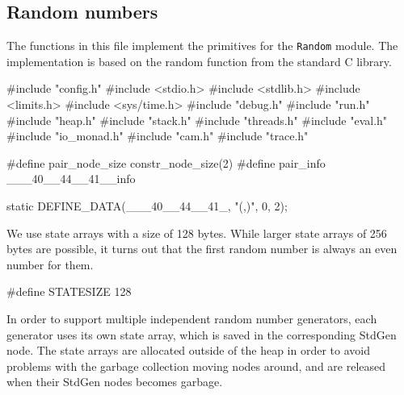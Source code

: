 %
%
\subsection{Random numbers}
The functions in this file implement the primitives for the
\texttt{Random} module. The implementation is based on the
{\Tt{}random\nwendquote} function from the standard C library.

\nwenddocs{}\endmoddef\nwstartdeflinemarkup{}\nwenddeflinemarkup
#include "config.h"
#include <stdio.h>
#include <stdlib.h>
#include <limits.h>
#include <sys/time.h>
#include "debug.h"
#include "run.h"
#include "heap.h"
#include "stack.h"
#include "threads.h"
#include "eval.h"
#include "io_monad.h"
#include "cam.h"
#include "trace.h"

#define pair_node_size   constr_node_size(2)
#define pair_info        ___40__44__41__info

static DEFINE_DATA(___40__44__41_, "(,)", 0, 2);

\nwendcode{}\nwdocspar
We use state arrays with a size of 128 bytes. While larger state
arrays of 256 bytes are possible, it turns out that the first random
number is always an even number for them.

\nwenddocs{}\plusendmoddef\nwstartdeflinemarkup{}\nwenddeflinemarkup
#define STATESIZE 128

\nwendcode{}\nwdocspar
In order to support multiple independent random number generators,
each generator uses its own state array, which is saved in the
corresponding {\Tt{}StdGen\nwendquote} node. The state arrays are allocated outside
of the heap in order to avoid problems with the garbage collection
moving nodes around, and are released when their {\Tt{}StdGen\nwendquote} nodes
becomes garbage.

